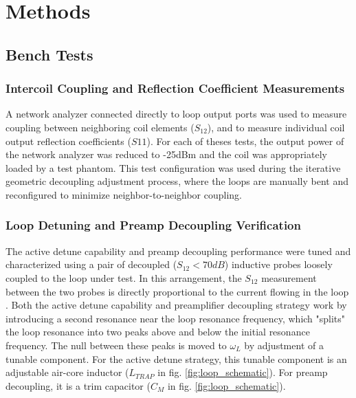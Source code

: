 \chapter{Methods}

\section{Bench Tests}
\subsection{Intercoil Coupling and Reflection Coefficient Measurements}
A network analyzer connected directly to loop output ports was used to measure coupling between neighboring coil
elements ($S_{12}$), and to measure individual coil output reflection coefficients ($S{11}$). For each of theses tests,
the output power of the network analyzer was reduced to -25dBm and the coil was appropriately loaded by a test phantom.
This test configuration was used during the iterative geometric decoupling adjustment process, where the loops are
manually bent and reconfigured to minimize neighbor-to-neighbor coupling.

\subsection{Loop Detuning and Preamp Decoupling Verification}
The active detune capability and preamp decoupling performance were  tuned and characterized using a pair of decoupled
($S_{12}<70dB$) inductive probes loosely coupled to the loop under test. In this arrangement, the $S_{12}$ measurement
between the two probes is directly proportional to the current flowing in the loop \cite{Reykowski1995}. Both the active
detune capability and preamplifier decoupling strategy work by introducing a second resonance near the loop resonance
frequency, which "splits" the loop resonance into two peaks above and below the initial resonance frequency. The null
between these peaks is moved to $\omega_L$ by adjustment of a tunable component. For the active detune strategy, this
tunable component is an adjustable air-core inductor ($L_{TRAP}$ in fig. \ref{fig:loop_schematic}). For preamp
decoupling, it is a trim capacitor ($C_M$ in fig.  \ref{fig:loop_schematic}).

